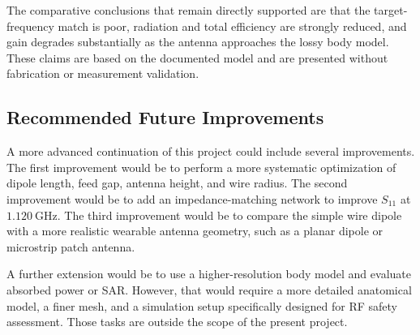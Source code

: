 The comparative conclusions that remain directly supported are that the target-frequency match is poor, radiation and total efficiency are strongly reduced, and gain degrades substantially as the antenna approaches the lossy body model. These claims are based on the documented model and are presented without fabrication or measurement validation.

\subsection{Recommended Future Improvements}

A more advanced continuation of this project could include several improvements. The first improvement would be to perform a more systematic optimization of dipole length, feed gap, antenna height, and wire radius. The second improvement would be to add an impedance-matching network to improve \(S_{11}\) at \(1.120~\mathrm{GHz}\). The third improvement would be to compare the simple wire dipole with a more realistic wearable antenna geometry, such as a planar dipole or microstrip patch antenna.

A further extension would be to use a higher-resolution body model and evaluate absorbed power or SAR. However, that would require a more detailed anatomical model, a finer mesh, and a simulation setup specifically designed for RF safety assessment. Those tasks are outside the scope of the present project.
